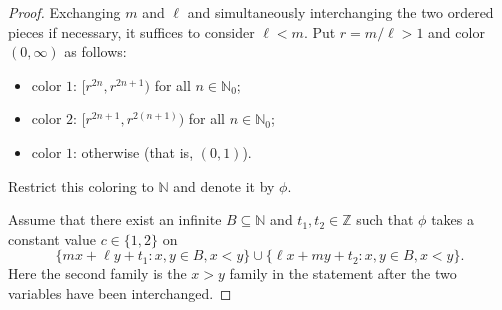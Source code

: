 \documentclass[10pt,a4paper]{amsart}
\def \N {\mathbb N}
\newcommand{\Nzero}{\mathbb N_0}
\begin{document}
\begin{proof}
Exchanging $m$ and $\ell$ and simultaneously interchanging the two ordered
pieces if necessary, it suffices to consider $\ell<m$. Put
$r=m/\ell>1$ and color $(0,\infty)$ as follows:
\begin{itemize}
	\item color $1$: $[r^{2n},r^{2n+1})$ for all $n\in\Nzero$;
	\item color $2$: $[r^{2n+1},r^{2(n+1)})$ for all $n\in\Nzero$;
	\item color $1$: otherwise (that is, $(0,1)$).
\end{itemize}
Restrict this coloring to $\N$ and denote it by $\phi$.

\medskip
Assume that there exist an infinite $B\subseteq \N$ and
$t_1,t_2\in\mathbb Z$ such that $\phi$ takes a constant value
$c\in\{1,2\}$ on
\[
\{mx+\ell y+t_1:x,y\in B,x<y\}
\cup\{\ell x+my+t_2:x,y\in B,x<y\}.
\]
Here the second family is the $x>y$ family in the statement after the two
variables have been interchanged.


\end{proof}
\end{document}
